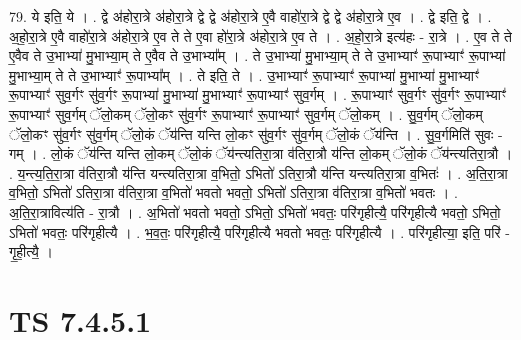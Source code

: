 \documentclass[17pt]{extarticle}
\begin{document}
79. ये इति॒ ये । . द्वे अ॑होरा॒त्रे अ॑होरा॒त्रे द्वे द्वे अ॑होरा॒त्रे ए॒वै वाहो॑रा॒त्रे द्वे द्वे अ॑होरा॒त्रे ए॒व । . द्वे इति॒ द्वे । . अ॒हो॒रा॒त्रे ए॒वै वाहो॑रा॒त्रे अ॑होरा॒त्रे ए॒व ते ते ए॒वा हो॑रा॒त्रे अ॑होरा॒त्रे ए॒व ते । . अ॒हो॒रा॒त्रे इत्य॑हः - रा॒त्रे । . ए॒व ते ते ए॒वैव ते उ॒भाभ्या॑ मु॒भाभ्या॒म् ते ए॒वैव ते उ॒भाभ्या᳚म् । . ते उ॒भाभ्या॑ मु॒भाभ्या॒म् ते ते उ॒भाभ्याꣳ॑ रू॒पाभ्याꣳ॑ रू॒पाभ्या॑ मु॒भाभ्या॒म् ते ते उ॒भाभ्याꣳ॑ रू॒पाभ्या᳚म् । . ते इति॒ ते । . उ॒भाभ्याꣳ॑ रू॒पाभ्याꣳ॑ रू॒पाभ्या॑ मु॒भाभ्या॑ मु॒भाभ्याꣳ॑ रू॒पाभ्याꣳ॑ सुव॒र्गꣳ सु॑व॒र्गꣳ रू॒पाभ्या॑ मु॒भाभ्या॑ मु॒भाभ्याꣳ॑ रू॒पाभ्याꣳ॑ सुव॒र्गम् । . रू॒पाभ्याꣳ॑ सुव॒र्गꣳ सु॑व॒र्गꣳ रू॒पाभ्याꣳ॑ रू॒पाभ्याꣳ॑ सुव॒र्गम् ॅलो॒कम् ॅलो॒कꣳ सु॑व॒र्गꣳ रू॒पाभ्याꣳ॑ रू॒पाभ्याꣳ॑ सुव॒र्गम् ॅलो॒कम् । . सु॒व॒र्गम् ॅलो॒कम् ॅलो॒कꣳ सु॑व॒र्गꣳ सु॑व॒र्गम् ॅलो॒कं ॅय॑न्ति यन्ति लो॒कꣳ सु॑व॒र्गꣳ सु॑व॒र्गम् ॅलो॒कं ॅय॑न्ति । . सु॒व॒र्गमिति॑ सुवः - गम् । . लो॒कं ॅय॑न्ति यन्ति लो॒कम् ॅलो॒कं ॅय॑न्त्यतिरा॒त्रा व॑तिरा॒त्रौ य॑न्ति लो॒कम् ॅलो॒कं ॅय॑न्त्यतिरा॒त्रौ । . य॒न्त्य॒ति॒रा॒त्रा व॑तिरा॒त्रौ य॑न्ति यन्त्यतिरा॒त्रा व॒भितो॒ ऽभितो॑ ऽतिरा॒त्रौ य॑न्ति यन्त्यतिरा॒त्रा व॒भितः॑ । . अ॒ति॒रा॒त्रा व॒भितो॒ ऽभितो॑ ऽतिरा॒त्रा व॑तिरा॒त्रा व॒भितो॑ भवतो भवतो॒ ऽभितो॑ ऽतिरा॒त्रा व॑तिरा॒त्रा व॒भितो॑ भवतः । . अ॒ति॒रा॒त्रावित्य॑ति - रा॒त्रौ । . अ॒भितो॑ भवतो भवतो॒ ऽभितो॒ ऽभितो॑ भवतः॒ परि॑गृहीत्यै॒ परि॑गृहीत्यै भवतो॒ ऽभितो॒ ऽभितो॑ भवतः॒ परि॑गृहीत्यै । . भ॒व॒तः॒ परि॑गृहीत्यै॒ परि॑गृहीत्यै भवतो भवतः॒ परि॑गृहीत्यै । . परि॑गृहीत्या॒ इति॒ परि॑ - गृ॒ही॒त्यै॒ । \newline
\pagebreak
{}

\section{ TS 7.4.5.1 }
\end{document}
